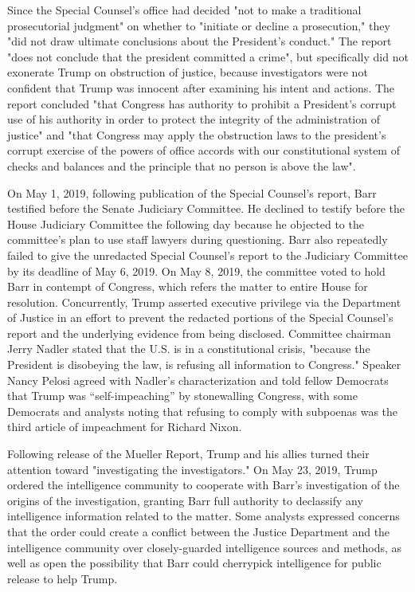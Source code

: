 Since the Special Counsel's office had decided "not to make a
traditional prosecutorial judgment" on whether to "initiate or decline a
prosecution," they "did not draw ultimate conclusions about the
President's conduct." The report "does not conclude that the president
committed a crime", but specifically did not exonerate Trump on
obstruction of justice, because investigators were not confident that
Trump was innocent after examining his intent and actions. The report
concluded "that Congress has authority to prohibit a President's corrupt
use of his authority in order to protect the integrity of the
administration of justice" and "that Congress may apply the obstruction
laws to the president's corrupt exercise of the powers of office accords
with our constitutional system of checks and balances and the principle
that no person is above the law".

On May 1, 2019, following publication of the Special Counsel's report,
Barr testified before the Senate Judiciary Committee. He declined to
testify before the House Judiciary Committee the following day because
he objected to the committee's plan to use staff lawyers during
questioning. Barr also repeatedly failed to give the unredacted Special
Counsel's report to the Judiciary Committee by its deadline of May 6,
2019. On May 8, 2019, the committee voted to hold Barr in contempt of
Congress, which refers the matter to entire House for resolution.
Concurrently, Trump asserted executive privilege via the Department of
Justice in an effort to prevent the redacted portions of the Special
Counsel's report and the underlying evidence from being disclosed.
Committee chairman Jerry Nadler stated that the U.S. is in a
constitutional crisis, "because the President is disobeying the law, is
refusing all information to Congress." Speaker Nancy Pelosi agreed with
Nadler's characterization and told fellow Democrats that Trump was
``self-impeaching'' by stonewalling Congress, with some Democrats and
analysts noting that refusing to comply with subpoenas was the third
article of impeachment for Richard Nixon.

Following release of the Mueller Report, Trump and his allies turned
their attention toward "investigating the investigators." On May 23,
2019, Trump ordered the intelligence community to cooperate with Barr's
investigation of the origins of the investigation, granting Barr full
authority to declassify any intelligence information related to the
matter. Some analysts expressed concerns that the order could create a
conflict between the Justice Department and the intelligence community
over closely-guarded intelligence sources and methods, as well as open
the possibility that Barr could cherrypick intelligence for public
release to help Trump.


